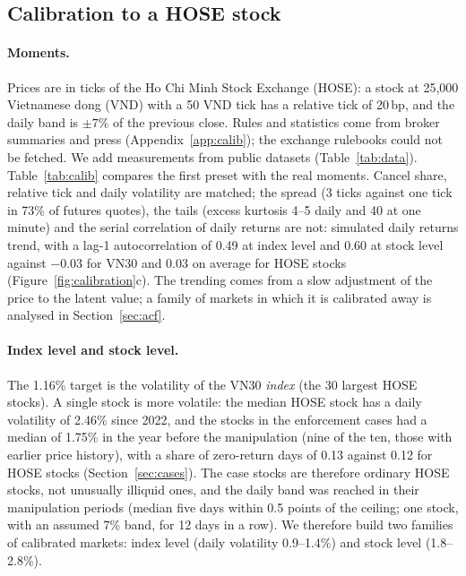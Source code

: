 \subsection{Calibration to a HOSE stock}\label{sec:calib}

\paragraph{Moments.} Prices are in ticks of the Ho Chi Minh Stock Exchange (HOSE): a stock at 25,000 Vietnamese dong (VND) with a 50 VND tick has a relative tick of 20\,bp, and the daily band is $\pm 7\%$ of the previous close. Rules and statistics come from broker summaries and press (Appendix~\ref{app:calib}); the exchange rulebooks could not be fetched. We add measurements from public datasets (Table~\ref{tab:data}). Table~\ref{tab:calib} compares the first preset with the real moments. Cancel share, relative tick and daily volatility are matched; the spread (3 ticks against one tick in 73\% of futures quotes), the tails (excess kurtosis 4--5 daily and 40 at one minute) and the serial correlation of daily returns are not: simulated daily returns trend, with a lag-1 autocorrelation of 0.49 at index level and 0.60 at stock level against $-0.03$ for VN30 and 0.03 on average for HOSE stocks (Figure~\ref{fig:calibration}c). The trending comes from a slow adjustment of the price to the latent value; a family of markets in which it is calibrated away is analysed in Section~\ref{sec:acf}.

\paragraph{Index level and stock level.} The 1.16\% target is the volatility of the VN30 \emph{index} (the 30 largest HOSE stocks). A single stock is more volatile: the median HOSE stock has a daily volatility of 2.46\% since 2022, and the stocks in the enforcement cases had a median of 1.75\% in the year before the manipulation (nine of the ten, those with earlier price history), with a share of zero-return days of 0.13 against 0.12 for HOSE stocks (Section~\ref{sec:cases}). The case stocks are therefore ordinary HOSE stocks, not unusually illiquid ones, and the daily band was reached in their manipulation periods (median five days within 0.5 points of the ceiling; one stock, with an assumed 7\% band, for 12 days in a row). We therefore build two families of calibrated markets: index level (daily volatility 0.9--1.4\%) and stock level (1.8--2.8\%).

